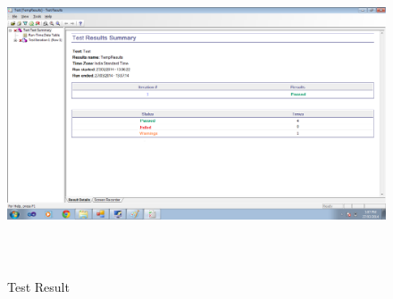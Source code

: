 \begin{figure}[ht!]
	\centering
\includegraphics[height=250pt,width=450pt]{test_result.png}\\
\caption{Test Result}
\end{figure}
